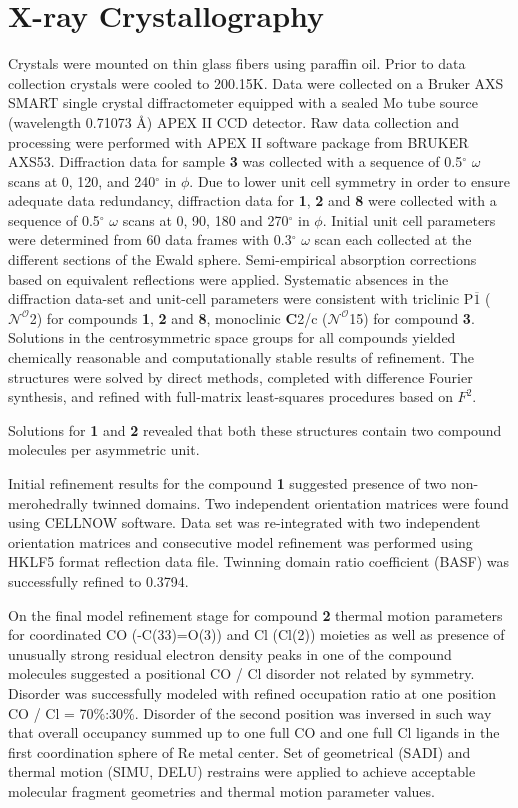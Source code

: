 \section{X-ray Crystallography} \label{sec.xray}
Crystals were mounted on thin glass fibers using paraffin oil. Prior to data collection crystals were cooled to 200.15K. Data were collected on a Bruker AXS SMART single crystal diffractometer equipped with a sealed Mo tube source (wavelength 0.71073 \r{A}) APEX II CCD detector. Raw data collection and processing were performed with APEX II software package from BRUKER AXS53. Diffraction data for sample \textbf{3} was collected with a sequence of 0.5$^\circ$ $\omega$ scans at 0, 120, and 240$^\circ$ in $\phi$. Due to lower unit cell symmetry in order to ensure adequate data redundancy, diffraction data for \textbf{1}, \textbf{2} and \textbf{8} were collected with a sequence of 0.5$^\circ$ $\omega$ scans at 0, 90, 180 and 270$^\circ$ in $\phi$. Initial unit cell parameters were determined from 60 data frames with 0.3$^\circ$ $\omega$ scan each collected at the different sections of the Ewald sphere. Semi-empirical absorption corrections based on equivalent reflections were applied\autocite{blessing1995}. Systematic absences in the diffraction data-set and unit-cell parameters were consistent with triclinic P$\overline{1}$ ($\mathcal{N} ^\mathcal{O}$2) for compounds \textbf{1}, \textbf{2} and \textbf{8}, monoclinic \textbf{C}2/c ($\mathcal{N} ^\mathcal{O}$15) for compound \textbf{3}. Solutions in the centrosymmetric space groups for all compounds yielded chemically reasonable and computationally stable results of refinement. The structures were solved by direct methods, completed with difference Fourier synthesis, and refined with full-matrix least-squares procedures based on $F^2$.

Solutions for \textbf{1} and \textbf{2} revealed that both these structures contain two compound molecules per asymmetric unit.

Initial refinement results for the compound \textbf{1} suggested presence of two non-merohedrally twinned domains. Two independent orientation matrices were found using CELL\textunderscore NOW software\autocite{cellnow}. Data set was re-integrated with two independent orientation matrices and consecutive model refinement was performed using HKLF5 format reflection data file. Twinning domain ratio coefficient (BASF) was successfully refined to 0.3794.

On the final model refinement stage for compound \textbf{2} thermal motion parameters for coordinated CO (-C(33)=O(3)) and Cl (Cl(2)) moieties as well as presence of unusually strong residual electron density peaks in one of the compound molecules suggested a positional CO / Cl disorder not related by symmetry. Disorder was successfully modeled with refined occupation ratio at one position CO / Cl = 70\%:30\%. Disorder of the second position was inversed in such way that overall occupancy summed up to one full CO and one full Cl ligands in the first coordination sphere of Re metal center. Set of geometrical (SADI) and thermal motion (SIMU, DELU) restrains were applied to achieve acceptable molecular fragment geometries and thermal motion parameter values.

